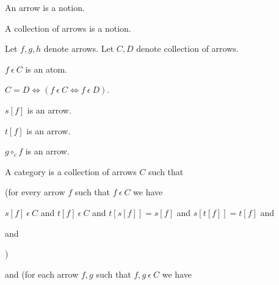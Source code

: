 \documentclass{article}
\newcommand{\mcirc}{\circ_{c}}
\newcommand{\inn}{~\epsilon~}
\begin{document}
	\begin{forthel}
		
		\begin{signature} An arrow is a notion. \end{signature}
		\begin{signature} A collection of arrows is a notion. \end{signature}
		
		Let $f,g,h$ denote arrows.
		Let $C,D$ denote collection of arrows.
		
		\begin{signature} $f\inn C$ is an atom. \end{signature}
		
		\begin{axiom}
			$C = D \iff (f\inn C \iff f \inn D)$.
		\end{axiom}
		
		\begin{signature} $s[f]$ is an arrow. \end{signature}   
		\begin{signature} $t[f]$ is an arrow. \end{signature}  
		
		\begin{signature} $g \mcirc f$ is an arrow.\end{signature}
		
		
		\begin{definition} 
			A category is a collection of arrows $C$ such that
			
			(for every arrow $f$ such that $f\inn C$ we have
			
			$s[f] \inn C$ and $t[f] \inn C$ and
			$t[s[f]]=s[f]$ and $s[t[f]]=t[f]$ and
			 
			\begin{center}
			\end{center}	
			and
			\begin{center}
				)
			\end{center}
			and (for each arrow $f,g$ such that $f,g \inn C$ we have
			

\end{definition}
\end{forthel}
\end{document}
